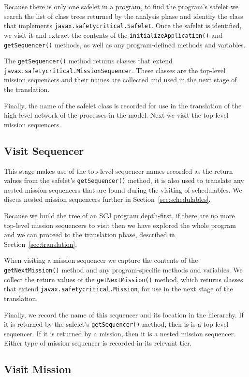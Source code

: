 \documentclass[10pt,a4paper]{article}
\begin{document}
Because there is only one safelet in a program, to find the program's safelet we search the list of class trees returned by the analysis phase and identify the class that implements \texttt{javax.safetycritical.Safelet}. Once the safelet is identified, we visit it and extract the contents of the \texttt{initializeApplication()} and \texttt{getSequencer()} methods, as well as any program-defined methods and variables. 

The \texttt{getSequencer()} method returns classes that extend \texttt{javax.safetycritical.MissionSequencer}. These classes are the top-level mission sequencers and their names are collected and used in the next stage of the translation. 

Finally, the name of the safelet class is recorded for use in the translation of the high-level network of the processes in the model. Next we visit the top-level mission sequencers.

\subsection{Visit Sequencer}
\label{sec:sequencer}
This stage makes use of the top-level sequencer names recorded as the return values from the safelet's \texttt{getSequencer()} method, it is also used to translate any nested mission sequencers that are found during the visiting of schedulables. We discus nested mission sequencers further in Section~\ref{sec:schedulables}.

Because we build the tree of an SCJ program depth-first, if there are no more top-level mission sequencers to visit then we have explored the whole program and we can proceed to the translation phase, described in Section~\ref{sec:translation}.

When visiting a mission sequencer we capture the contents of the \texttt{getNextMission()} method and any program-specific methods and variables. We collect the return values of the \texttt{getNextMission()} method, which returns classes that extend \texttt{javax.safetycritical.Mission}, for use in the next stage of the translation. 

Finally, we record the name of this sequencer and its location in the hierarchy. If it is returned by the safelet's \texttt{getSequencer()} method, then is is a top-level sequencer. If it is returned by a mission, then it is a nested mission sequencer. Either type of mission sequencer is recorded in its relevant tier.

\subsection{Visit Mission}
\end{document}
